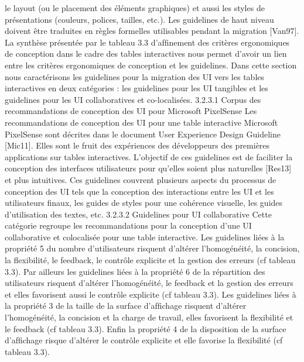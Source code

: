 \documentclass{article}
\begin{document}
le layout (ou le placement des \'{e}l\'{e}ments graphiques) et aussi les styles de pr\'{e}sentations (couleurs,
polices, tailles, etc.).
Les guidelines de haut niveau doivent \^{e}tre traduites en r\`{e}gles formelles utilisables pendant la migration [Van97]. La synth\`{e}se pr\'{e}sent\'{e}e par le tableau 3.3 d’afﬁnement des crit\`{e}res ergonomiques de
conception dans le cadre des tables interactives nous permet d’avoir un lien entre les crit\`{e}res ergonomiques de conception et les guidelines.
Dans cette section nous caract\'{e}risons les guidelines pour la migration des UI vers les tables interactives en deux cat\'{e}gories : les guidelines pour les UI tangibles et les guidelines pour les UI collaboratives et co-localis\'{e}es.
3.2.3.1
Corpus des recommandations de conception des UI pour Microsoft PixelSense
Les recommandations de conception des UI pour une table interactive Microsoft PixelSense
sont d\'{e}crites dans le document User Experience Design Guideline [Mic11]. Elles sont le fruit des
exp\'{e}riences des d\'{e}veloppeurs des premi\`{e}res applications sur tables interactives. L’objectif de ces
guidelines est de faciliter la conception des interfaces utilisateurs pour qu’elles soient plus naturelles [Res13] et plus intuitives. Ces guidelines couvrent plusieurs aspects du processus de conception
des UI tels que la conception des interactions entre les UI et les utilisateurs ﬁnaux, les guides de styles
pour une coh\'{e}rence visuelle, les guides d’utilisation des textes, etc.
3.2.3.2
Guidelines pour UI collaborative
Cette cat\'{e}gorie regroupe les recommandations pour la conception d’une UI collaborative et colocalis\'{e}e pour une table interactive. Les guidelines li\'{e}es \`{a} la propri\'{e}t\'{e} 5 du nombre d’utilisateurs
risquent d’alt\'{e}rer l’homog\'{e}n\'{e}it\'{e}, la concision, la ﬂexibilit\'{e}, le feedback, le contr\^{o}le explicite et la
gestion des erreurs (cf tableau 3.3). Par ailleurs les guidelines li\'{e}es \`{a} la propri\'{e}t\'{e} 6 de la r\'{e}partition
des utilisateurs risquent d’alt\'{e}rer l’homog\'{e}n\'{e}it\'{e}, le feedback et la gestion des erreurs et elles favorisent
aussi le contr\^{o}le explicite (cf tableau 3.3). Les guidelines li\'{e}es \`{a} la propri\'{e}t\'{e} 3 de la taille de la surface
d’afﬁchage risquent d’alt\'{e}rer l’homog\'{e}n\'{e}it\'{e}, la concision et la charge de travail, elles favorisent la
ﬂexibilit\'{e} et le feedback (cf tableau 3.3). Enﬁn la propri\'{e}t\'{e} 4 de la disposition de la surface d’afﬁchage
risque d’alt\'{e}rer le contr\^{o}le explicite et elle favorise la ﬂexibilit\'{e} (cf tableau 3.3).
\end{document}
